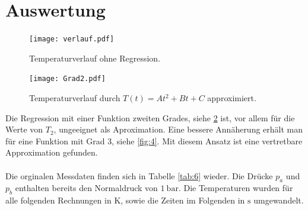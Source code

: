 \section{Auswertung}
\begin{figure}[p]
  \centering
  \texttt{[image: verlauf.pdf]}
  \caption{Temperaturverlauf ohne Regression.}
  \label{fig:5}
\end{figure}
\label{sec:Auswertung}
\begin{figure}[p]
  \centering
  \texttt{[image: Grad2.pdf]}
  \caption{Temperaturverlauf durch $T(t) = At^2 + Bt + C$ approximiert.}
  \label{fig:3}
\end{figure}
Die Regression mit einer Funktion zweiten Grades, siehe \ref{fig:3} ist, vor
allem für die Werte von $T_2$, ungeeignet als Aproximation.
Eine bessere Annäherung erhält man für eine Funktion mit Grad 3, siehe \ref{fig:4}.
Mit diesem Ansatz ist eine vertretbare Approximation gefunden.
\\
\\
Die orginalen Messdaten finden sich in Tabelle \ref{tab:6} wieder. Die Drücke
$p_a$ und $p_b$ enthalten bereits den Normaldruck von $\SI{1}{\bar}$. Die Temperaturen
wurden für alle folgenden Rechnungen in $\si{\kelvin}$, sowie die Zeiten
im Folgenden in $\si{\second}$ umgewandelt.
